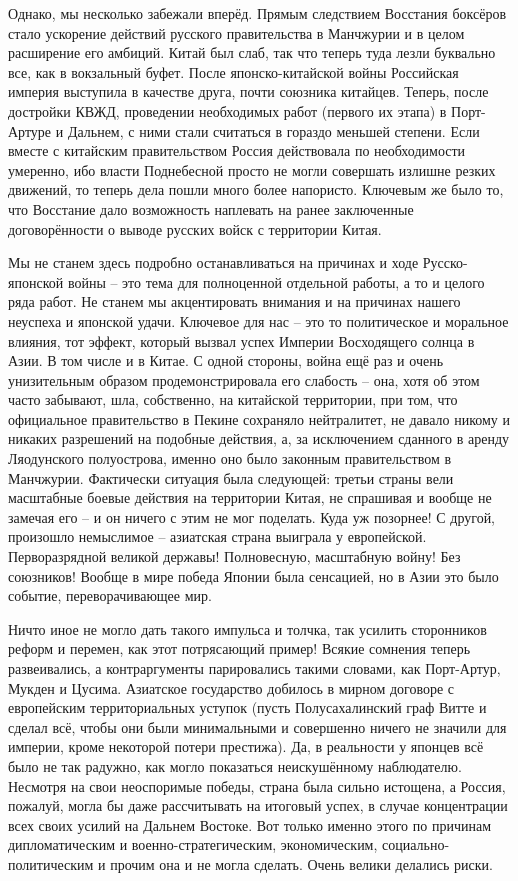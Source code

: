 Однако, мы несколько забежали вперёд. Прямым следствием Восстания боксёров стало ускорение действий русского правительства в Манчжурии и в целом расширение его амбиций. Китай был слаб, так что теперь туда лезли буквально все, как в вокзальный буфет. После японско-китайской войны Российская империя выступила в качестве друга, почти союзника китайцев. Теперь, после достройки КВЖД, проведении необходимых работ (первого их этапа) в Порт-Артуре и Дальнем, с ними стали считаться в гораздо меньшей степени. Если вместе с китайским правительством Россия действовала по необходимости умеренно, ибо власти Поднебесной просто не могли совершать излишне резких движений, то теперь дела пошли много более напористо. Ключевым же было то, что Восстание дало возможность наплевать на ранее заключенные договорённости о выводе русских войск с территории Китая.

Мы не станем здесь подробно останавливаться на причинах и ходе Русско-японской войны – это тема для полноценной отдельной работы, а то и целого ряда работ. Не станем мы акцентировать внимания и на причинах нашего неуспеха и японской удачи. Ключевое для нас – это то политическое и моральное влияния, тот эффект, который вызвал успех Империи Восходящего солнца в Азии. В том числе и в Китае. С одной стороны, война ещё раз и очень унизительным образом продемонстрировала его слабость – она, хотя об этом часто забывают, шла, собственно, на китайской территории, при том, что официальное правительство в Пекине сохраняло нейтралитет, не давало никому и никаких разрешений на подобные действия, а, за исключением сданного в аренду Ляодунского полуострова, именно оно было законным правительством в Манчжурии. Фактически ситуация была следующей: третьи страны вели масштабные боевые действия на территории Китая, не спрашивая и вообще не замечая его – и он ничего с этим не мог поделать. Куда уж позорнее! С другой, произошло немыслимое – азиатская страна выиграла у европейской. Перворазрядной великой державы! Полновесную, масштабную войну! Без союзников! Вообще в мире победа Японии была сенсацией, но в Азии это было событие, переворачивающее мир.

Ничто иное не могло дать такого импульса и толчка, так усилить сторонников реформ и перемен, как этот потрясающий пример! Всякие сомнения теперь развеивались, а контраргументы парировались такими словами, как Порт-Артур, Мукден и Цусима. Азиатское государство добилось в мирном договоре с европейским территориальных уступок (пусть Полусахалинский граф Витте и сделал всё, чтобы они были минимальными и совершенно ничего не значили для империи, кроме некоторой потери престижа). Да, в реальности у японцев всё было не так радужно, как могло показаться неискушённому наблюдателю. Несмотря на свои неоспоримые победы, страна была сильно истощена, а Россия, пожалуй, могла бы даже рассчитывать на итоговый успех, в случае концентрации всех своих усилий на Дальнем Востоке. Вот только именно этого по причинам дипломатическим и военно-стратегическим, экономическим, социально-политическим и прочим она и не могла сделать. Очень велики делались риски.

